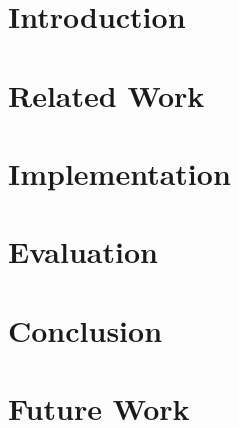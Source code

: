 






\cleardoublepage{}
{}
\tableofcontents

\chapter{Introduction}
\label{introduction}


\chapter{Related Work}
\label{relatedwork}


\chapter{Implementation}
\label{implementation}


\chapter{Evaluation}
\label{evaluation}


\chapter{Conclusion}
\label{conclusion}


\chapter{Future Work}
\label{future_work}


\cleardoublepage{}
\thispagestyle{empty}
\listoffigures

\newpage

\listoftables


